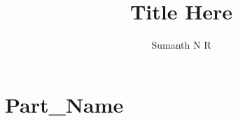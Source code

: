 \documentclass{report}
\title{\Huge{Title Here}}
\author{\huge{Sumanth N R}}
\date{}
\begin{document}
\maketitle
\newpage
{}
\tableofcontents
\pagebreak

\part{Part_Name} \label{part:part_name}


\end{document}
